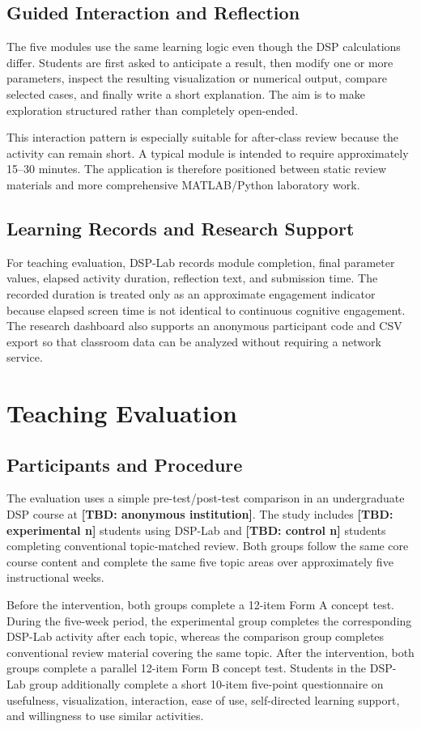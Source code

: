 \documentclass[11pt,a4paper]{article}
\newcommand{\tbd}[1]{\textbf{[TBD: #1]}}
\begin{document}
\subsection{Guided Interaction and Reflection}
The five modules use the same learning logic even though the DSP calculations differ. Students are first asked to anticipate a result, then modify one or more parameters, inspect the resulting visualization or numerical output, compare selected cases, and finally write a short explanation. The aim is to make exploration structured rather than completely open-ended.

This interaction pattern is especially suitable for after-class review because the activity can remain short. A typical module is intended to require approximately 15--30 minutes. The application is therefore positioned between static review materials and more comprehensive MATLAB/Python laboratory work.

\subsection{Learning Records and Research Support}
For teaching evaluation, DSP-Lab records module completion, final parameter values, elapsed activity duration, reflection text, and submission time. The recorded duration is treated only as an approximate engagement indicator because elapsed screen time is not identical to continuous cognitive engagement. The research dashboard also supports an anonymous participant code and CSV export so that classroom data can be analyzed without requiring a network service.

\section{Teaching Evaluation}
\subsection{Participants and Procedure}
The evaluation uses a simple pre-test/post-test comparison in an undergraduate DSP course at \tbd{anonymous institution}. The study includes \tbd{experimental n} students using DSP-Lab and \tbd{control n} students completing conventional topic-matched review. Both groups follow the same core course content and complete the same five topic areas over approximately five instructional weeks.

Before the intervention, both groups complete a 12-item Form A concept test. During the five-week period, the experimental group completes the corresponding DSP-Lab activity after each topic, whereas the comparison group completes conventional review material covering the same topic. After the intervention, both groups complete a parallel 12-item Form B concept test. Students in the DSP-Lab group additionally complete a short 10-item five-point questionnaire on usefulness, visualization, interaction, ease of use, self-directed learning support, and willingness to use similar activities.
\end{document}
